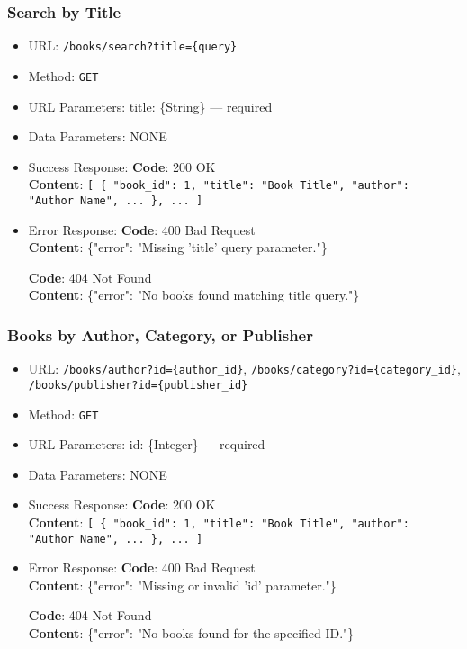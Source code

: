 \subsubsection*{Search by Title}

\begin{itemize}
    \item URL: \texttt{/books/search?title=\{query\}}
    \item Method: \texttt{GET}
    \item URL Parameters: title: \{String\} — required
    \item Data Parameters: NONE

    \item Success Response: \newline
    \textbf{Code}: 200 OK \\
    \textbf{Content}: \texttt{[ \{ "book\_id": 1, "title": "Book Title", "author": "Author Name", ... \}, ... ]}

    \item Error Response: \newline
    \textbf{Code}: 400 Bad Request \\
    \textbf{Content}: \{"error": "Missing 'title' query parameter."\}

    \textbf{Code}: 404 Not Found \\
    \textbf{Content}: \{"error": "No books found matching title query."\}
\end{itemize}

\subsubsection*{Books by Author, Category, or Publisher}

\begin{itemize}
    \item URL: \texttt{/books/author?id=\{author\_id\}}, \texttt{/books/category?id=\{category\_id\}}, \texttt{/books/publisher?id=\{publisher\_id\}}
    \item Method: \texttt{GET}
    \item URL Parameters: id: \{Integer\} — required

    \item Data Parameters: NONE

    \item Success Response: \newline
    \textbf{Code}: 200 OK \\
    \textbf{Content}: \texttt{[ \{ "book\_id": 1, "title": "Book Title", "author": "Author Name", ... \}, ... ]}

    \item Error Response: \newline
    \textbf{Code}: 400 Bad Request \\
    \textbf{Content}: \{"error": "Missing or invalid 'id' parameter."\}

    \textbf{Code}: 404 Not Found \\
    \textbf{Content}: \{"error": "No books found for the specified ID."\}
\end{itemize}

